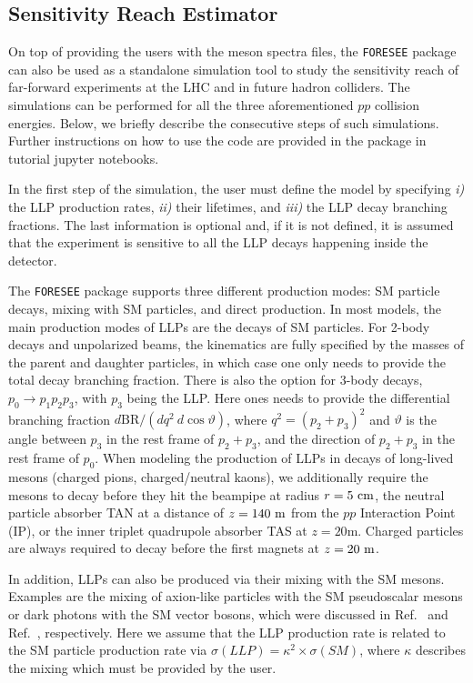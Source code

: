 \documentclass[prd,twocolumn,reprint,preprintnumbers,nofootinbib]{revtex4-1}
\begin{document}
\subsection{Sensitivity Reach Estimator}
\label{sec:code} 

On top of providing the users with the meson spectra files, the \texttt{FORESEE} package can also be used as a standalone simulation tool to study the sensitivity reach of far-forward experiments at the LHC and in future hadron colliders. The simulations can be performed for all the three aforementioned $pp$ collision energies. Below, we briefly describe the consecutive steps of such simulations. Further instructions on how to use the code are provided in the package in tutorial jupyter notebooks. 

In the first step of the simulation, the user must define the model by specifying \textsl{i)} the LLP production rates, \textsl{ii)} their lifetimes, and \textsl{iii)} the LLP decay branching fractions. The last information is optional and, if it is not defined, it is assumed that the experiment is sensitive to all the LLP decays happening inside the detector.

The \texttt{FORESEE} package supports three different production modes: SM particle decays, mixing with SM particles, and direct production. In most models, the main production modes of LLPs are the decays of SM particles. For 2-body decays and unpolarized beams, the kinematics are fully specified by the masses of the parent and daughter particles, in which case one only needs to provide the total decay branching fraction. There is also the option for 3-body decays, $p_0 \to p_1 p_2 p_3$, with $p_3$ being the LLP. Here ones needs to provide the differential branching fraction $d\text{BR}/(dq^2 \ d\cos\vartheta)$, where $q^2=(p_2+p_3)^2$ and $\vartheta$ is the angle between $p_3$ in the rest frame of $p_2+p_3$, and the direction of $p_2+p_3$ in the rest frame of $p_0$. When modeling the production of LLPs in decays of long-lived mesons (charged pions, charged/neutral kaons), we additionally require the mesons to decay before they hit the beampipe at radius $r=5~\text{cm}$, the neutral particle absorber TAN at a distance of $z=140~\text{m}$ from the $pp$ Interaction Point (IP), or the inner triplet quadrupole absorber TAS at $z=20$m. Charged particles are always required to decay before the first magnets at $z=20~\text{m}$.

In addition, LLPs can also be produced via their mixing with the SM mesons. Examples are the mixing of axion-like particles with the SM pseudoscalar mesons or dark photons with the SM vector bosons, which were discussed in Ref.~\cite{Ariga:2018uku} and Ref.~\cite{Berlin:2018jbm}, respectively. Here we assume that the LLP production rate is related to the SM particle production rate via $\sigma(LLP) = \kappa^2 \times \sigma(SM)$, where $\kappa$ describes the mixing which must be provided by the user. 
\end{document}
